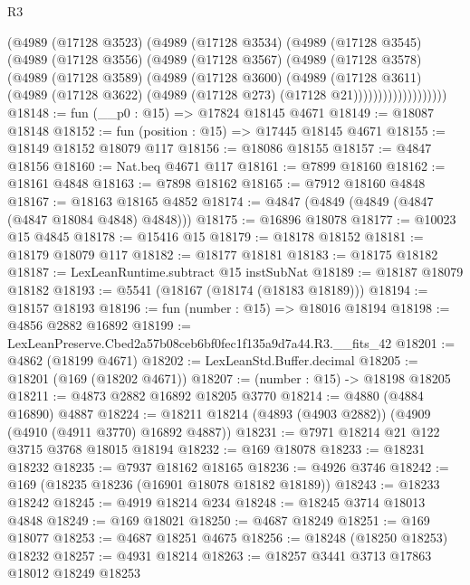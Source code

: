 \begin{lexlean}{R3}
\begin{coremodule}
                  (@4989
                    (@17128 @3523)
                    (@4989
                      (@17128 @3534)
                      (@4989
                        (@17128 @3545)
                        (@4989
                          (@17128 @3556)
                          (@4989
                            (@17128 @3567)
                            (@4989
                              (@17128 @3578)
                              (@4989
                                (@17128 @3589)
                                (@4989
                                  (@17128 @3600)
                                  (@4989
                                    (@17128 @3611)
                                    (@4989
                                      (@17128 @3622)
                                      (@4989 (@17128 @273) (@17128 @21)))))))))))))))))))
@18148 := fun (__p0 : @15) => @17824 @18145 @4671
@18149 := @18087 @18148
@18152 := fun (position : @15) => @17445 @18145 @4671
@18155 := @18149 @18152 @18079 @117
@18156 := @18086 @18155
@18157 := @4847 @18156
@18160 := Nat.beq @4671 @117
@18161 := @7899 @18160
@18162 := @18161 @4848
@18163 := @7898 @18162
@18165 := @7912 @18160 @4848
@18167 := @18163 @18165 @4852
@18174 := @4847 (@4849 (@4849 (@4847 (@4847 @18084 @4848) @4848)))
@18175 := @16896 @18078
@18177 := @10023 @15 @4845
@18178 := @15416 @15
@18179 := @18178 @18152
@18181 := @18179 @18079 @117
@18182 := @18177 @18181
@18183 := @18175 @18182
@18187 := LexLeanRuntime.subtract @15 instSubNat
@18189 := @18187 @18079 @18182
@18193 := @5541 (@18167 (@18174 (@18183 @18189)))
@18194 := @18157 @18193
@18196 := fun (number : @15) => @18016 @18194
@18198 := @4856 @2882 @16892
@18199 := LexLeanPreserve.Cbed2a57b08ceb6bf0fec1f135a9d7a44.R3.__fits_42
@18201 := @4862 (@18199 @4671)
@18202 := LexLeanStd.Buffer.decimal
@18205 := @18201 (@169 (@18202 @4671))
@18207 := (number : @15) -> @18198 @18205
@18211 := @4873 @2882 @16892 @18205 @3770
@18214 := @4880 (@4884 @16890) @4887
@18224 := @18211 @18214 (@4893 (@4903 @2882)) (@4909 (@4910 (@4911 @3770) @16892 @4887))
@18231 := @7971 @18214 @21 @122 @3715 @3768 @18015 @18194
@18232 := @169 @18078
@18233 := @18231 @18232
@18235 := @7937 @18162 @18165
@18236 := @4926 @3746
@18242 := @169 (@18235 @18236 (@16901 @18078 @18182 @18189))
@18243 := @18233 @18242
@18245 := @4919 @18214 @234
@18248 := @18245 @3714 @18013 @4848
@18249 := @169 @18021
@18250 := @4687 @18249
@18251 := @169 @18077
@18253 := @4687 @18251 @4675
@18256 := @18248 (@18250 @18253) @18232
@18257 := @4931 @18214
@18263 := @18257 @3441 @3713 @17863 @18012 @18249 @18253

\end{coremodule}
\end{lexlean}
